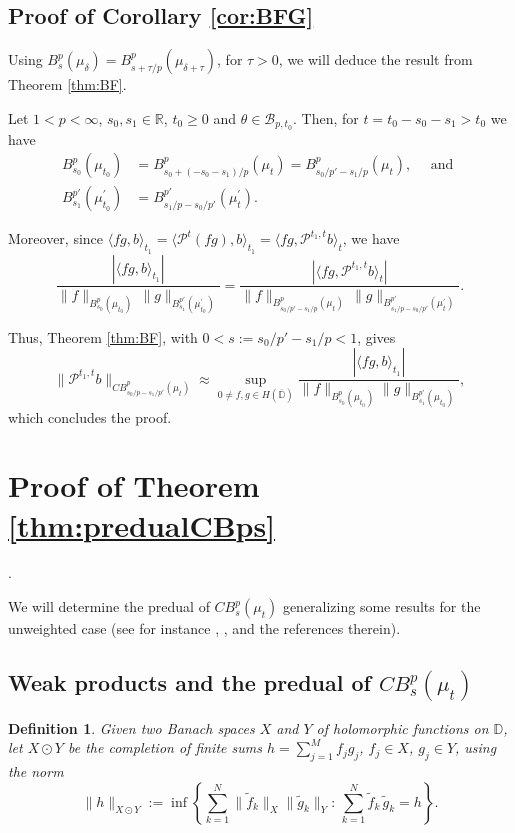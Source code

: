 \documentclass[12pt,twoside,leqno,final]{amsart}
\theoremstyle{plain}
\newtheorem{defn}[thm]{Definition}
\begin{document}
\subsection{Proof of Corollary \ref{cor:BFG}} \label{sec:proof BFG}

Using $ B^p_s(\mu_\delta)=B^p_{s+\tau/p}(\mu_{\delta+\tau})$, for $\tau>0$, 
we will deduce the result from Theorem \ref{thm:BF}.

Let $1<p<\infty$, $s_0,s_1\in{{\mathbb R}}$, $t_0\ge 0$ and $\theta\in{{\mathcal B}}_{p,t_0}$. Then, for  $t=t_0-s_0-s_1> t_0$ we have 
\begin{align*}
B^p_{s_0}(\mu_{t_0})&=B^p_{s_0+(-s_0-s_1)/p}(\mu_t)=B^p_{s_0/p'-s_1/p}(\mu_t),\quad\text{ and }\\
B^{p'}_{s_1}(\mu^\prime_{t_0})&=B^{p'}_{s_1/p-s_0/p'}(\mu^\prime_t).
\end{align*}

Moreover, since $\langle f g, b\rangle_{t_1}=\langle {{\mathcal P}}^t(f g), b\rangle_{t_1}=\langle fg, {{\mathcal P}}^{t_1,t}b\rangle_{t}$,
we have 
$$
\frac{|\langle fg, b\rangle_{t_1}|}
{\|f\|_{B^p_{s_0}(\mu_{t_0})}\,\|g\|_{B^{p'}_{s_1}(\mu^\prime_{t_0})}}=
\frac{|\langle fg, {{\mathcal P}}^{t_1,t}b\rangle_{t}|}
{\|f\|_{B^p_{s_0/p'-s_1/p}(\mu_t)}\,\|g\|_{B^{p'}_{s_1/p-s_0/p'}(\mu^\prime_t)}}.
$$

Thus, Theorem \ref{thm:BF}, with $0<s:=s_0/p'-s_1/p<1$, gives
$$
\|{{\mathcal P}}^{t_1,t} b\|_{CB^p_{s_0/p-s_1/p'}(\mu_t)}
\approx \sup_{0\ne f,g\in H(\overline {{\mathbb D}})}\frac{|\langle fg,b\rangle_{t_1}|}{\|f\|_{B^p_{s_0}(\mu_{t_0})}\|g\|_{B^{p'}_{s_1}(\mu_{t_0})}},
$$
which concludes the proof.

\section{Proof of Theorem \ref{thm:predualCBps}}.\label{sec:duality}
\quad\par 

We will determine the predual of $CB^p_s(\mu_t)$ generalizing some results  
for the unweighted case (see for instance \cite{Ro-Wu}, \cite{Ar-Ro-Saw-W2}, 
\cite{Co-Ve} and the references therein).

\subsection{Weak products and the  predual of $CB^p_s(\mu_t)$}

\begin{defn} Given two Banach spaces $X$ and $Y$ of holomorphic functions on ${{\mathbb D}}$, let  
 $X\odot Y$ be the completion of finite sums $h=\sum_{j=1}^M f_j g_j$, 
 $f_j\in X$, $g_j\in Y$, using the norm
 $$
 \|h\|_{X\odot Y}:=\inf\left\{\sum_{k=1}^N \|\tilde f_k\|_X\|\tilde g_k\|_Y:\,
 \sum_{k=1}^N \tilde f_k\,\tilde g_k=h\right\}.
 $$
\end{defn}
\end{document}
